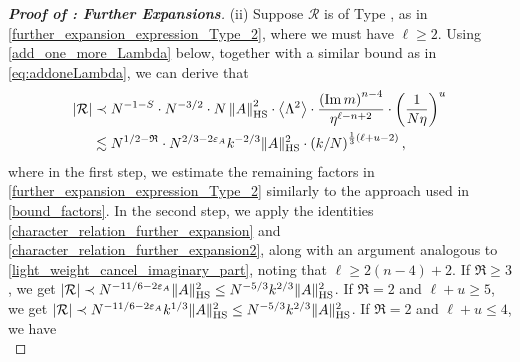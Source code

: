 \documentclass[10pt,reqno]{amsart}
\numberwithin{equation}{section}
\numberwithin{figure}{section}
\newcommand{\rmnum}[1]{\uppercase\expandafter{\romannumeral #1}}
\theoremstyle{plain} %
\theoremstyle{definition} %
\newcommand{\wt}{\widetilde}
\renewcommand{\txt}[1]{\text{\rm{#1}}}
\newcommand{\cR}{{\mathcal R}}
\newcommand{\fR}{\mathfrak R}
\newcommand{\fC}{\mathfrak C}
\newcommand{\fP}{\mathfrak P}
\newcommand{\fM}{\mathfrak M}
\newcommand{\fI}{\mathfrak I}
\newcommand{\fE}{\mathfrak E}
\newcommand{\sC}{\mathsf C}
\newcommand{\sP}{\mathsf P}
\renewcommand{\leq}{\le}
\renewcommand{\geq}{\ge}
\newcommand{\pa}[1]{\left({#1}\right)}
\newcommand{\absa}[1]{\left\lvert #1 \right\rvert}
\newcommand{\norm}[1]{\lVert #1 \rVert}
\newcommand{\norma}[1]{\left\lVert #1 \right\rVert}
\newcommand{\avga}[1]{\left\langle #1 \right\rangle}
\DeclareMathOperator{\im}{\mathrm{Im}}
\newcommand{\tLambda}{{\wt{\Lambda}}}
\newcommand{\HS}{\txt{HS}}
\newcommand{\tl}{\tLambda}
\newcommand{\mm}{\ell}
\numberwithin{equation}{section}
\begin{document}
\begin{proof}[\bf Proof of : Further Expansions]
        \medskip
        \noindent(ii) Suppose $\cR$ is of Type \rmnum{2}, as in \eqref{further_expansion_expression_Type_2}, where we must have $\mm\geq 2$. Using \eqref{add_one_more_Lambda} below, together with a similar bound as in \eqref{eq:addoneLambda}, we can derive that 
         \begin{align}
                \absa{\cR}&\prec N^{-1-S}\cdot N^{-3/2}\cdot N\norma{A}_{\HS}^2\cdot \avga{\Lambda^2}\cdot \frac{\pa{\im m}^{n-4}}{\eta^{\mm-n+2}}\cdot \pa{\frac{1}{N\eta}}^{u} \nonumber\\
                &\lesssim N^{1/2-\fR}\cdot N^{2/3-2\varepsilon_A}k^{-2/3}\norm{A}_{\HS}^2\cdot \pa{k/N}^{\frac13(\mm+u-2)}, \label{eq:weak_further_expansion2}
            \end{align}
        where in the first step, we estimate the remaining factors in \eqref{further_expansion_expression_Type_2} similarly to the approach used in \eqref{bound_factors}. In the second step, we apply the identities \eqref{character_relation_further_expansion} and \eqref{character_relation_further_expansion2}, along with an argument analogous to \eqref{light_weight_cancel_imaginary_part}, noting that $\mm\geq 2\pa{n-4}+2$.
        If $\fR\geq 3$, we get $\absa{\cR}\prec N^{-11/6-2\varepsilon_A}\norm{A}_{\HS}^2\le {N^{-5/3}k^{2/3}\norm{A}_{\HS}^2}$. %
        If $\fR=2$ and $\mm+u\geq 5$, we get $\absa{\cR}\prec N^{-11/6-2\varepsilon_A}k^{1/3}\norm{A}_{\HS}^2\le {N^{-5/3}k^{2/3}\norm{A}_{\HS}^2}$. If $\fR=2$ and $\mm+u\leq 4$, we have
        \begin{equation}\nonumber

\end{equation}
\end{proof}
\end{document}
